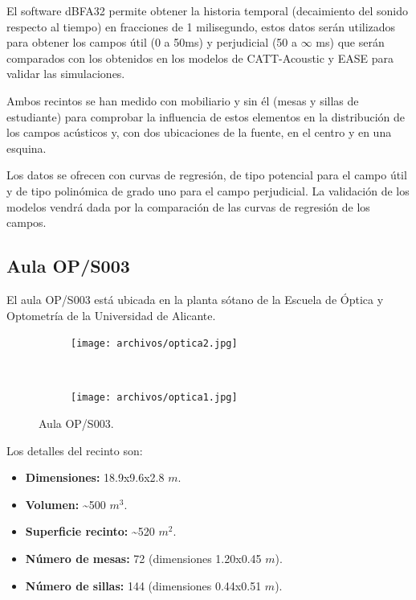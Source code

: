 El software dBFA32 permite obtener la historia temporal (decaimiento del sonido respecto al tiempo) en fracciones de 1 milisegundo, estos datos serán utilizados para obtener los campos útil (0 a 50ms) y perjudicial (50 a $\infty$ ms) que serán comparados con los obtenidos en los modelos de CATT-Acoustic y EASE para validar las simulaciones.

Ambos recintos se han medido con mobiliario y sin él (mesas y sillas de estudiante) para comprobar la influencia de estos elementos en la distribución de los campos acústicos y, con dos ubicaciones de la fuente, en el centro y en una esquina.

Los datos se ofrecen con curvas de regresión, de tipo potencial para el campo útil y de tipo polinómica de grado uno para el campo perjudicial. La validación de los modelos vendrá dada por la comparación de las curvas de regresión de los campos.

\subsection{Aula OP/S003}

El aula OP/S003 está ubicada en la planta sótano de la Escuela de Óptica y Optometría de la Universidad de Alicante.

\begin{figure}[ht]
    \centering
    \begin{subfigure}[b]{0.4\textwidth}
    	\centering
        \texttt{[image: archivos/optica2.jpg]}
    \end{subfigure}
    ~ %
    \begin{subfigure}[b]{0.4\textwidth}
    	\centering
        \texttt{[image: archivos/optica1.jpg]}
    \end{subfigure}
    \caption{Aula OP/S003.}\label{fotosoptica}
\end{figure}
\FloatBarrier 

Los detalles del recinto son:
\begin{itemize}
\itemsep0em
  \item \textbf{Dimensiones:} 18.9x9.6x2.8 $m$.
  \item \textbf{Volumen:} \textasciitilde500 $m^3$.
  \item \textbf{Superficie recinto:} \textasciitilde520 $m^2$.
  \item \textbf{Número de mesas:} 72 (dimensiones 1.20x0.45 $m$).
  \item \textbf{Número de sillas:} 144 (dimensiones 0.44x0.51 $m$).
\end{itemize}

